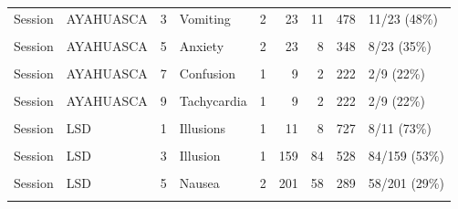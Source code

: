 \begin{table}[!h]
{\begin{tabular}[t]{llrlrrrrl}
Session & AYAHUASCA & 3 & Vomiting & 2 & 23 & 11 & 478 & 11/23 (48\%)\\
\cellcolor{gray!10}{Session} & \cellcolor{gray!10}{AYAHUASCA} & \cellcolor{gray!10}{4} & \cellcolor{gray!10}{Hypertension} & \cellcolor{gray!10}{1} & \cellcolor{gray!10}{9} & \cellcolor{gray!10}{4} & \cellcolor{gray!10}{444} & \cellcolor{gray!10}{4/9 (44\%)}\\
Session & AYAHUASCA & 5 & Anxiety & 2 & 23 & 8 & 348 & 8/23 (35\%)\\
\addlinespace
\cellcolor{gray!10}{Session} & \cellcolor{gray!10}{AYAHUASCA} & \cellcolor{gray!10}{6} & \cellcolor{gray!10}{Headache} & \cellcolor{gray!10}{2} & \cellcolor{gray!10}{23} & \cellcolor{gray!10}{8} & \cellcolor{gray!10}{348} & \cellcolor{gray!10}{8/23 (35\%)}\\
Session & AYAHUASCA & 7 & Confusion & 1 & 9 & 2 & 222 & 2/9 (22\%)\\
\cellcolor{gray!10}{Session} & \cellcolor{gray!10}{AYAHUASCA} & \cellcolor{gray!10}{8} & \cellcolor{gray!10}{Drowsiness} & \cellcolor{gray!10}{1} & \cellcolor{gray!10}{9} & \cellcolor{gray!10}{2} & \cellcolor{gray!10}{222} & \cellcolor{gray!10}{2/9 (22\%)}\\
Session & AYAHUASCA & 9 & Tachycardia & 1 & 9 & 2 & 222 & 2/9 (22\%)\\
\cellcolor{gray!10}{Session} & \cellcolor{gray!10}{AYAHUASCA} & \cellcolor{gray!10}{10} & \cellcolor{gray!10}{Diarrhea} & \cellcolor{gray!10}{1} & \cellcolor{gray!10}{9} & \cellcolor{gray!10}{1} & \cellcolor{gray!10}{111} & \cellcolor{gray!10}{1/9 (11\%)}\\
\addlinespace
Session & LSD & 1 & Illusions & 1 & 11 & 8 & 727 & 8/11 (73\%)\\
\cellcolor{gray!10}{Session} & \cellcolor{gray!10}{LSD} & \cellcolor{gray!10}{2} & \cellcolor{gray!10}{Time perception altered} & \cellcolor{gray!10}{1} & \cellcolor{gray!10}{11} & \cellcolor{gray!10}{6} & \cellcolor{gray!10}{545} & \cellcolor{gray!10}{6/11 (55\%)}\\
Session & LSD & 3 & Illusion & 1 & 159 & 84 & 528 & 84/159 (53\%)\\
\cellcolor{gray!10}{Session} & \cellcolor{gray!10}{LSD} & \cellcolor{gray!10}{4} & \cellcolor{gray!10}{Impaired gait} & \cellcolor{gray!10}{3} & \cellcolor{gray!10}{77} & \cellcolor{gray!10}{28} & \cellcolor{gray!10}{364} & \cellcolor{gray!10}{28/77 (36\%)}\\
Session & LSD & 5 & Nausea & 2 & 201 & 58 & 289 & 58/201 (29\%)\\
\addlinespace

\end{tabular}}
\end{table}
